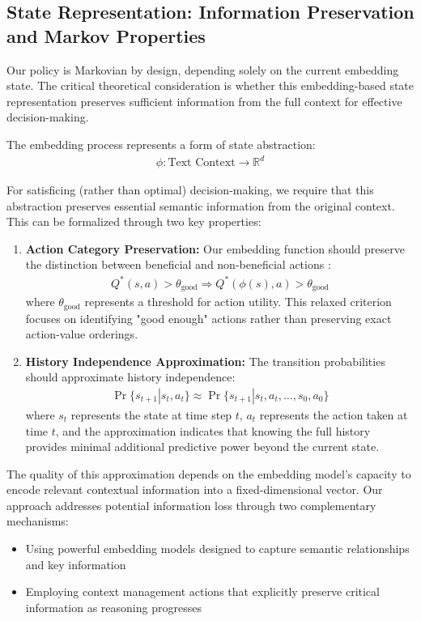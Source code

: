 \documentclass[10pt,journal,compsoc]{IEEEtran}
\begin{document}
\subsection{State Representation: Information Preservation and Markov Properties}

Our policy is Markovian by design, depending solely on the current embedding state. The critical theoretical consideration is whether this embedding-based state representation preserves sufficient information from the full context for effective decision-making.

The embedding process represents a form of state abstraction:
\begin{align}
\phi: \text{Text Context} \rightarrow \mathbb{R}^d
\end{align}

For satisficing (rather than optimal) decision-making, we require that this abstraction preserves essential semantic information from the original context. This can be formalized through two key properties:

\begin{enumerate}
\item \textbf{Action Category Preservation:} Our embedding function should preserve the distinction between beneficial and non-beneficial actions \citep{li2006towards}:
\begin{align}
Q^*(s, a) > \theta_{\text{good}} \Rightarrow Q^*(\phi(s), a) > \theta_{\text{good}}
\end{align}
where $\theta_{\text{good}}$ represents a threshold for action utility. This relaxed criterion focuses on identifying "good enough" actions rather than preserving exact action-value orderings.

\item \textbf{History Independence Approximation:} The transition probabilities should approximate history independence:
\begin{align}
\Pr\{s_{t+1} | s_t, a_t\} \approx \Pr\{s_{t+1} | s_t, a_t, \ldots, s_0, a_0\}
\end{align}
where $s_t$ represents the state at time step $t$, $a_t$ represents the action taken at time $t$, and the approximation indicates that knowing the full history provides minimal additional predictive power beyond the current state.
\end{enumerate}

The quality of this approximation depends on the embedding model's capacity to encode relevant contextual information into a fixed-dimensional vector. Our approach addresses potential information loss through two complementary mechanisms:
\begin{itemize}
\item Using powerful embedding models designed to capture semantic relationships and key information
\item Employing context management actions that explicitly preserve critical information as reasoning progresses
\end{itemize}
\end{document}
